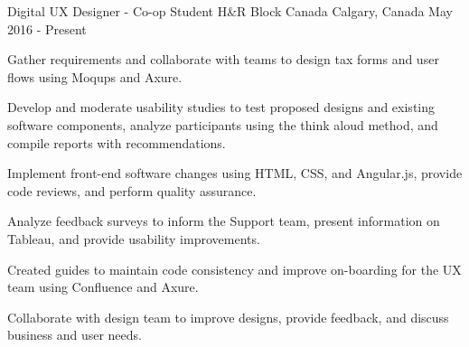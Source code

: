 \cventry
    {Digital UX Designer - Co-op Student}
    {H\&R Block Canada}
    {Calgary, Canada}
    {May 2016 - Present}
    {
      \begin{cvitems}
        \item {Gather requirements and collaborate with teams to design tax forms and user flows using Moqups and Axure.}
        \item {Develop and moderate usability studies to test proposed designs and existing software components, analyze participants using the think aloud method, and compile reports with recommendations.}
        \item {Implement front-end software changes using HTML, CSS, and Angular.js, provide code reviews, and perform quality assurance.}
        \item {Analyze feedback surveys to inform the Support team, present information on Tableau, and provide usability improvements.}
        \item {Created guides to maintain code consistency and improve on-boarding for the UX team using Confluence and Axure.}
        \item {Collaborate with design team to improve designs, provide feedback, and discuss business and user needs.}
      \end{cvitems}
    }

